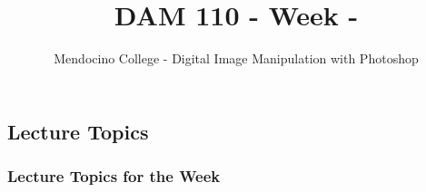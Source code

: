 \documentclass{beamer}
\title{DAM 110 - Week  - }
\author{Mendocino College - Digital Image Manipulation with Photoshop}
\date{\vspace{-5em}}
\begin{document}
	{
		\begin{frame}
			\vspace{-35pt}
			\maketitle
		\end{frame}
	}

	\section{}
			\subsection{Lecture Topics}		
	\begin{frame}
		\frametitle{Lecture Topics for the Week}
				\begin{outline}
					\1 
					\1 
					\1 
				\end{outline}
		\end{frame}

	\section{}
			\subsection{}		
				\begin{frame}
					\frametitle{}
					\begin{outline}
						\1 
						\1 
						\1 
					\end{outline}
				\end{frame}
			
	\section{}
		\subsection{}		
			\begin{frame}
				\frametitle{}
				\begin{outline}
					\1 
					\1 
					\1 
				\end{outline}
			\end{frame}
			
	\section{}
\end{document}
